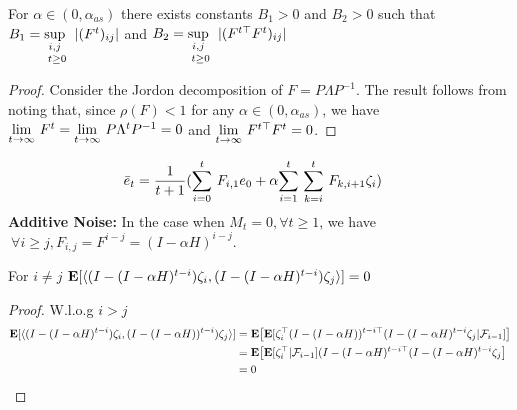 \begin{lemma}
For $\alpha \in (0,\alpha_{as})$ there exists constants $B_1>0$ and $B_2>0$ such that $B_1=\us{\us{\sup}{i,j}}{t\geq 0}|(F^t)_{ij}|$ and $B_2=\us{\us{\sup}{i,j}}{t\geq 0}|(F^{t\top}F^t)_{ij}|$
\end{lemma}
\begin{proof}
Consider the Jordon decomposition of $F=P\Lambda P^{-1}$. The result follows from noting that, since $\rho(F)<1$ for any $\alpha\in (0,\alpha_{as})$, we have $\us{\lim}{t\ra \infty}F^t=\us{\lim}{t\ra \infty} P\Lambda^t P^{-1} =0$ and $\us{\lim}{t\ra \infty}F^{t\top}F^t=0$.
\end{proof}
\begin{align}\label{addexp}
\eb_t&=\frac{1}{t+1}(\ous{\sum}{i=0}{t} F_{i,1} e_0+ \alpha\ous{\sum}{i=1}{t} \ous{\sum}{k=i}{t} F_{k,i+1}  \zeta_i )
\end{align}
\textbf{Additive Noise:}
In the case when $M_t=0,\forall t\geq 1$, we have $~\forall i\geq j, F_{i,j}=F^{i-j}=(I-\alpha H)^{i-j}$.
\begin{lemma}
For $i\neq j$ $\E[\ip{(I-(I-\alpha H)^{t-i}) \zeta_i, (I-(I-\alpha H)^{t-i}) \zeta_j}]=0$
\end{lemma}
\begin{proof}
W.l.o.g $i>j$
\begin{align}
\E[\ip{(I-(I-\alpha H)^{t-i}) \zeta_i, (I-(I-\alpha H))^{t-i}) \zeta_j}]&= \E\big[\E[\zeta_i^\top (I-(I-\alpha H))^{t-i\top} (I-(I-\alpha H)^{t-i} \zeta_j|\F_{i-1}]\big]\\
&= \E\big[\E[\zeta_i^\top|\F_{i-1}] (I-(I-\alpha H)^{t-i\top} (I-(I-\alpha H)^{t-i} \zeta_j\big]\\
&=0
\end{align}
\end{proof}

